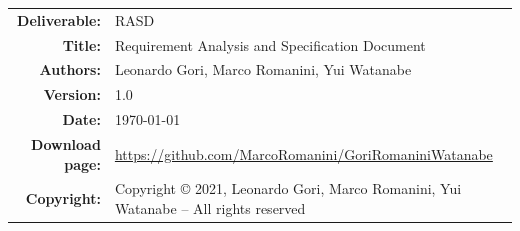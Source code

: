 


\begin{table}[H]
    \setlength\arrayrulewidth{1pt}
    \centering
    \begin{tabular}{rl}
        \hline
        \textbf{Deliverable:} & RASD\\
        \textbf{Title:} & Requirement Analysis and Specification Document \\
        \textbf{Authors:} & Leonardo Gori, Marco Romanini, Yui Watanabe \\
        \textbf{Version:} & 1.0 \\ 
        \textbf{Date:} & \today \\
        \textbf{Download page:} & \url{https://github.com/MarcoRomanini/GoriRomaniniWatanabe} \\
        \textbf{Copyright:} & Copyright © 2021, Leonardo Gori, Marco Romanini, Yui Watanabe – All rights reserved \\
        \hline
    \end{tabular}
\end{table}

\setcounter{page}{2}


\newpage
{}
\tableofcontents
\newpage
{}
\listoffigures
{}
\listoftables

